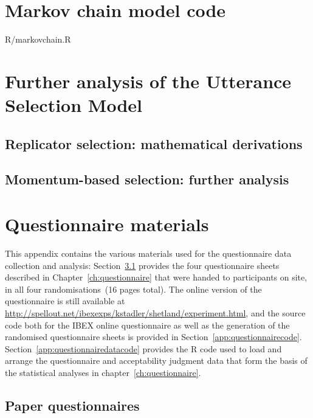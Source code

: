 \documentclass[oneside]{book}
\newcommand{\includeR}[1]{#1}
\begin{document}
\chapter{Markov chain model code}
\label{app:markovmodel}
\includeR{R/markovchain.R}

\chapter[Further analysis of the USM]{Further analysis of the Utterance Selection Model}
\label{app:math}

\section{Replicator selection: mathematical derivations}
%

\section{Momentum-based selection: further analysis}
%

\chapter{Questionnaire materials}
\label{app:questionnaire}
This appendix contains the various materials used for the questionnaire data collection and analysis: Section~\ref{app:paperquestionnaire} provides the four questionnaire sheets described in Chapter~\ref{ch:questionnaire} that were handed to participants on site, in all four randomisations~(16 pages total). The online version of the questionnaire is still available at \url{http://spellout.net/ibexexps/kstadler/shetland/experiment.html}, and the source code both for the IBEX online questionnaire as well as the generation of the randomised questionnaire sheets is provided in Section~\ref{app:questionnairecode}. Section~\ref{app:questionnairedatacode} provides the R code used to load and arrange the questionnaire and acceptability judgment data that form the basis of the statistical analyses in chapter~\ref{ch:questionnaire}.

\section{Paper questionnaires}
\label{app:paperquestionnaire}
%
%
\end{document}
